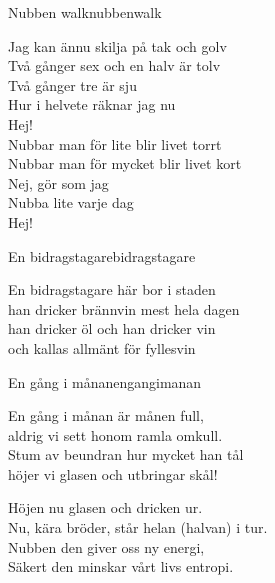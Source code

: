 \begin{song}{Nubben walk}{nubbenwalk}
\begin{vers}
Jag kan ännu skilja på tak och golv\\
Två gånger sex och en halv är tolv\\
Två gånger tre är sju\\
Hur i helvete räknar jag nu\\
Hej!\\
Nubbar man för lite blir livet torrt\\
Nubbar man för mycket blir livet kort\\
Nej, gör som jag\\
Nubba lite varje dag\\
Hej!\\
\end{vers}
\end{song}

\newpage

\begin{song}{En bidragstagare}{bidragstagare}
\begin{vers}
En bidragstagare här bor i staden\\
han dricker brännvin mest hela dagen\\
han dricker öl och han dricker vin\\
och kallas allmänt för fyllesvin\\
\end{vers}
\end{song}

\begin{song}{En gång i månan}{engangimanan}
\begin{vers}
En gång i månan är månen full,\\
aldrig vi sett honom ramla omkull.\\
Stum av beundran hur mycket han tål\\
höjer vi glasen och utbringar skål!\\
\end{vers}
\begin{vers}
Höjen nu glasen och dricken ur.\\
Nu, kära bröder, står helan (halvan) i tur.\\
Nubben den giver oss ny energi,\\
Säkert den minskar vårt livs entropi.\\
\end{vers}
\end{song}

